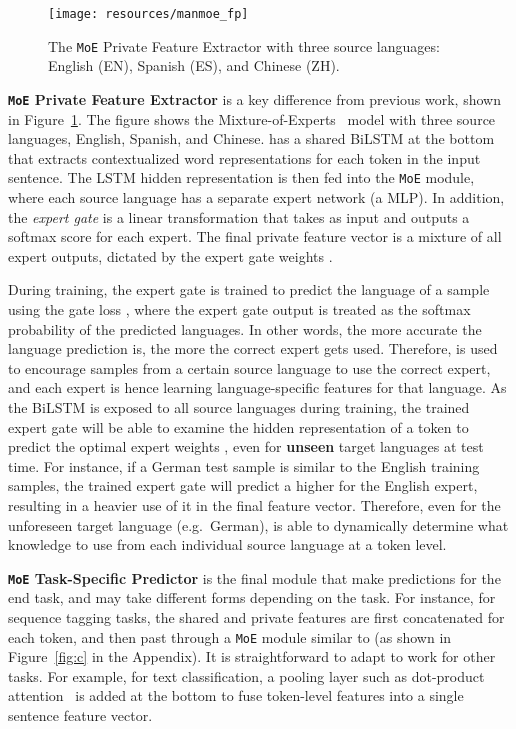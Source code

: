 \documentclass[11pt,a4paper]{article}
\newcommand{\moe}{\texttt{MoE}}
\begin{document}
\begin{figure}
    \centering
    \hspace{-3mm}\texttt{[image: resources/manmoe\_fp]}
    \caption{The \moe{} Private Feature Extractor  with three source languages: English (EN), Spanish (ES), and Chinese (ZH).}
    \label{fig:fp}
\vspace{-3mm}
\end{figure} 
\noindent\textbf{\moe{} Private Feature Extractor}  is a key difference from previous work, shown in Figure~\ref{fig:fp}.
The figure shows the Mixture-of-Experts~\citep{shazeer2017moe} model with three source languages, English, Spanish, and Chinese.
 has a shared BiLSTM at the bottom that extracts contextualized word representations for each token  in the input sentence.
The LSTM hidden representation  is then fed into the \moe{} module, where each source language has a separate expert network (a MLP).
In addition, the \emph{expert gate}  is a linear transformation that takes  as input and outputs a softmax score  for each expert.
The final private feature vector is a mixture of all expert outputs, dictated by the expert gate weights .

During training, the expert gate is trained to predict the language of a sample using the gate loss , where the expert gate output  is treated as the softmax probability of the predicted languages.
In other words, the more accurate the language prediction is, the more the correct expert gets used.
Therefore,  is used to encourage samples from a certain source language to use the correct expert, and each expert is hence learning language-specific features for that language.
As the BiLSTM is exposed to all source languages during training, the trained expert gate will be able to examine the hidden representation of a token to predict the optimal expert weights , even for \textbf{unseen} target languages at test time.
For instance, if a German test sample is similar to the English training samples, the trained expert gate will predict a higher  for the English expert, resulting in a heavier use of it in the final feature vector.
Therefore, even for the unforeseen target language (e.g.\ German),  is able to dynamically determine what knowledge to use from each individual source language at a token level.

\noindent\textbf{\moe{} Task-Specific Predictor}
 is the final module that make predictions for the end task, and may take different forms depending on the task.
For instance, for sequence tagging tasks, the shared and private features are first concatenated for each token, and then past through a \moe{} module similar to  (as shown in Figure~\ref{fig:c} in the Appendix).
It is straightforward to adapt  to work for other tasks.
For example, for text classification, a pooling layer such as dot-product attention~\citep{D15-1166} is added at the bottom to fuse token-level features into a single sentence feature vector.
\end{document}
